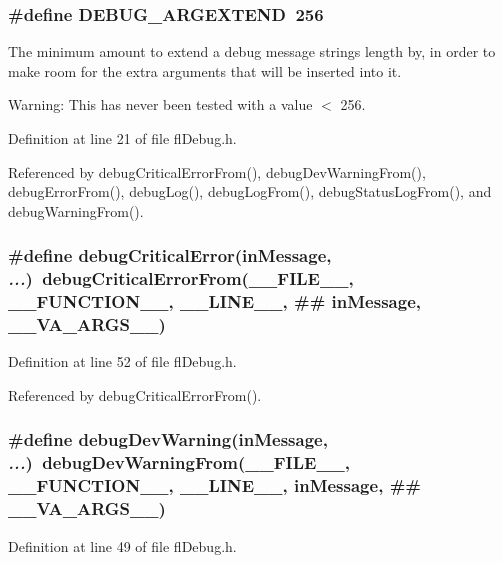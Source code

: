 \subsubsection{\setlength{\rightskip}{0pt plus 5cm}\#define DEBUG\_\-ARGEXTEND~256}\label{flDebug_8h_4f2b637a666d589c926da25b4e1f6450}


The minimum amount to extend a debug message strings length by, in order to make room for the extra arguments that will be inserted into it. 

\begin{Desc}
\item[Warning:]This has never been tested with a value $<$ 256. \end{Desc}


Definition at line 21 of file fl\-Debug.h.

Referenced by debug\-Critical\-Error\-From(), debug\-Dev\-Warning\-From(), debug\-Error\-From(), debug\-Log(), debug\-Log\-From(), debug\-Status\-Log\-From(), and debug\-Warning\-From().
\subsubsection{\setlength{\rightskip}{0pt plus 5cm}\#define debug\-Critical\-Error(in\-Message,  {\em ...})~debug\-Critical\-Error\-From(\_\-\_\-FILE\_\-\_\-, \_\-\_\-FUNCTION\_\-\_\-, \_\-\_\-LINE\_\-\_\-, \#\# in\-Message, \_\-\_\-VA\_\-ARGS\_\-\_\-)}\label{flDebug_8h_a660615532efcb945a6e19b81ac0bd41}




Definition at line 52 of file fl\-Debug.h.

Referenced by debug\-Critical\-Error\-From().
\subsubsection{\setlength{\rightskip}{0pt plus 5cm}\#define debug\-Dev\-Warning(in\-Message,  {\em ...})~debug\-Dev\-Warning\-From(\_\-\_\-FILE\_\-\_\-, \_\-\_\-FUNCTION\_\-\_\-, \_\-\_\-LINE\_\-\_\-, in\-Message, \#\# \_\-\_\-VA\_\-ARGS\_\-\_\-)}\label{flDebug_8h_d5943cf26301611cf94445fab201d878}




Definition at line 49 of file fl\-Debug.h.

